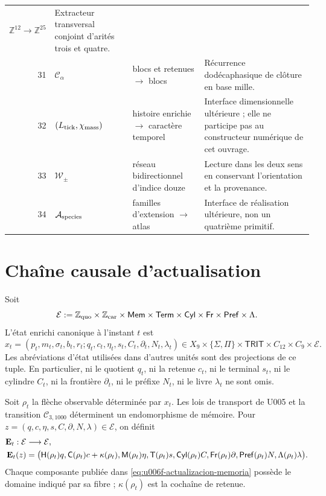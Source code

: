 \begin{longtable}{@{}r p{}p{}p{}@{}}
\(\mathbb Z^{12}\to\mathbb Z^{25}\)&
Extracteur transversal conjoint d’arités trois et quatre.\\
31&\(\mathcal C_\alpha\)&blocs et retenues \(\to\) blocs&
Récurrence dodécaphasique de clôture en base mille.\\
32&\((L_{\rm tick},\chi_{\rm mass})\)&histoire enrichie \(\to\)
caractère temporel&
Interface dimensionnelle ultérieure ; elle ne participe pas au constructeur numérique de
cet ouvrage.\\
33&\(\mathcal W_\pm\)&réseau bidirectionnel d’indice douze&
Lecture dans les deux sens en conservant l’orientation et la provenance.\\
34&\(\mathcal A_{\rm species}\)&familles d’extension \(\to\) atlas&
Interface de réalisation ultérieure, non un quatrième primitif.\\
\bottomrule
\end{longtable}
\endgroup

\section{Chaîne causale d'actualisation}

\begin{definition}
\label{def:u006f-esquema-estado}
Soit
\[
 \mathcal E:=
 \mathbb Z_{\rm quo}\times\mathbb Z_{\rm car}\times
 \mathsf{Mem}\times\mathsf{Term}\times\mathsf{Cyl}\times
 \mathsf{Fr}\times\mathsf{Pref}\times\Lambda .
\]
L’état enrichi canonique à l’instant \(t\) est
\begin{equation}
 x_t=(p_t,m_t,\sigma_t,b_t,r_t;
 q_t,c_t,\eta_t,s_t,C_t,\partial_t,N_t,\lambda_t)
 \in
 X_9\times\{\Sigma,\Pi\}\times\mathsf{TRIT}\times
 C_{12}\times C_9\times\mathcal E.
 \label{eq:u006f-esquema-estado}
\end{equation}
Les abréviations d’état utilisées dans d’autres unités sont des projections de
ce tuple. En particulier, ni le quotient \(q_t\), ni la retenue
\(c_t\), ni le terminal \(s_t\), ni le cylindre \(C_t\), ni la frontière
\(\partial_t\), ni le préfixe \(N_t\), ni le livre \(\lambda_t\) ne sont omis.
\end{definition}

Soit \(\rho_t\) la flèche observable déterminée par \(x_t\). Les lois de transport de U005 et la transition \(\mathcal C_{3,1000}\) déterminent un endomorphisme de mémoire. Pour \(z=(q,c,\eta,s,C,\partial,N,\lambda)\in\mathcal E\), on définit
\begin{align}
 \mathbf E_t:\mathcal E&\longrightarrow\mathcal E,\notag\\
 \mathbf E_t(z)&=\bigl(
 \mathsf H(\rho_t)q,
 \mathsf C(\rho_t)c+\kappa(\rho_t),
 \mathsf M(\rho_t)\eta,
 \mathsf T(\rho_t)s,
 \mathsf{Cyl}(\rho_t)C,
 \mathsf{Fr}(\rho_t)\partial,
 \mathsf{Pref}(\rho_t)N,
 \Lambda(\rho_t)\lambda
 \bigr).
 \label{eq:u006f-actualizacion-memoria}
\end{align}
Chaque composante publiée dans \eqref{eq:u006f-actualizacion-memoria} possède le
domaine indiqué par sa fibre ; \(\kappa(\rho_t)\) est la cochaîne de retenue.

